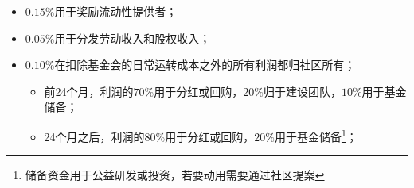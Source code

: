 \documentclass{article}
\begin{document}
\begin{itemize}
  \item $0.15\%$用于奖励流动性提供者；

  \item $0.05\%$用于分发劳动收入和股权收入；

  \item $0.10\%$在扣除基金会的日常运转成本之外的所有利润都归社区所有；

  \begin{itemize}
    \item 前24个月，利润的$70\%$用于分红或回购，$20\%$归于建设团队，$10\%$用于基金储备；
    \item 24个月之后，利润的$80\%$用于分红或回购，$20\%$用于基金储备\footnote{储备资金用于公益研发或投资，若要动用需要通过社区提案}；
  \end{itemize}
\end{itemize}

% 
%   
\end{document}
